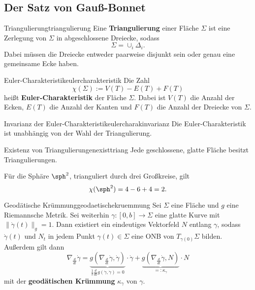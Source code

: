 \subsection{Der Satz von Gauß-Bonnet}
\label{subsec:gaussbonnet}
\begin{definition}{Triangulierung}{triangulierung}
Eine \textbf{Triangulierung} einer Fläche $\Sigma$ ist eine Zerlegung von $\Sigma$ in abgeschlossene Dreiecke, sodass
\begin{equation}
\Sigma = \cup_i \Delta_i.
\end{equation}
Dabei müssen die Dreiecke entweder paarweise disjunkt sein oder genau eine gemeinsame Ecke haben.
\end{definition}
\begin{definition}{Euler-Charakteristik}{eulercharakteristik}
Die Zahl
\begin{equation}
\chi(\Sigma) := V(T)-E(T)+F(T)
\end{equation}
heißt \textbf{Euler-Charakteristik} der Fläche $\Sigma$. Dabei ist $V(T)$ die Anzahl der Ecken, $E(T)$ die Anzahl der Kanten und $F(T)$ die Anzahl der Dreiecke von $\Sigma$.
\end{definition}
\begin{satz}{Invarianz der Euler-Charakteristik}{eulercharakinvarianz}
Die Euler-Charakteristik ist unabhängig von der Wahl der Triangulierung.
\end{satz}
\begin{satz}{Existenz von Triangulierungen}{existtriang}
Jede geschlossene, glatte Fläche besitzt Triangulierungen.
\end{satz}
\begin{beispiel}
Für die Sphäre $\sph^2$, trianguliert durch drei Großkreise, gilt
\begin{equation}
\chi (\sph^2) = 4-6+4 = 2.
\end{equation}
\end{beispiel}
\begin{satz}{Geodätische Krümmung}{geodaetischekruemmung}
Sei $\Sigma$ eine Fläche und $g$ eine Riemannsche Metrik. Sei weiterhin $\gamma: [0,b] \to \Sigma$ eine glatte Kurve mit $\| \dot{\gamma} (t)\|_g = 1$. Dann existiert ein eindeutiges Vektorfeld $N$ entlang $\gamma$, sodass $\dot{\gamma}(t)$ und $N_t$ in jedem Punkt $\gamma(t) \in \Sigma$ eine ONB von $T_{\gamma(0)}\Sigma$ bilden. Außerdem gilt dann
\begin{equation}
\nabla_\frac{d}{dt} \dot{\gamma} = \underbrace{g(\nabla_\frac{d}{dt} \dot{\gamma}, \dot{\gamma})}_{\frac{1}{2} \frac{d}{dt} g(\dot{\gamma}, \dot{\gamma}) = 0}\cdot \dot{\gamma} + \underbrace{g (\nabla_\frac{d}{dt} \dot{\gamma}, N)}_{=: \kappa_\gamma} \cdot N
\end{equation}
mit der \textbf{geodätischen Krümmung} $\kappa_\gamma$ von $\gamma$.
\end{satz}

